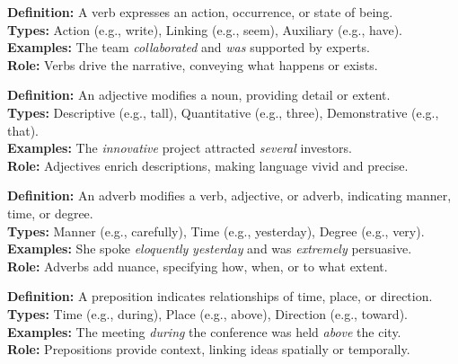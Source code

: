 \documentclass[a4paper,11pt]{article}
\begin{document}
\begin{tcolorbox}[colback=lightgray, colframe=navyblue, sharp corners, boxrule=0.5mm, title=\textbf{3. Verb: The Engine of Action}, boxsep=2pt, left=2pt, right=2pt, top=2pt, bottom=2pt]
    \footnotesize \textbf{Definition:} A verb expresses an action, occurrence, or state of being. \\
    \textbf{Types:} Action (e.g., write), Linking (e.g., seem), Auxiliary (e.g., have). \\
    \textbf{Examples:} The team \textit{collaborated} and \textit{was} supported by experts. \\
    \textbf{Role:} Verbs drive the narrative, conveying what happens or exists.
\end{tcolorbox}

\begin{tcolorbox}[colback=lightgray, colframe=navyblue, sharp corners, boxrule=0.5mm, title=\textbf{4. Adjective: The Descriptor}, boxsep=2pt, left=2pt, right=2pt, top=2pt, bottom=2pt]
    \footnotesize \textbf{Definition:} An adjective modifies a noun, providing detail or extent. \\
    \textbf{Types:} Descriptive (e.g., tall), Quantitative (e.g., three), Demonstrative (e.g., that). \\
    \textbf{Examples:} The \textit{innovative} project attracted \textit{several} investors. \\
    \textbf{Role:} Adjectives enrich descriptions, making language vivid and precise.
\end{tcolorbox}

\begin{tcolorbox}[colback=lightgray, colframe=navyblue, sharp corners, boxrule=0.5mm, title=\textbf{5. Adverb: The Modifier of Action}, boxsep=2pt, left=2pt, right=2pt, top=2pt, bottom=2pt]
    \footnotesize \textbf{Definition:} An adverb modifies a verb, adjective, or adverb, indicating manner, time, or degree. \\
    \textbf{Types:} Manner (e.g., carefully), Time (e.g., yesterday), Degree (e.g., very). \\
    \textbf{Examples:} She spoke \textit{eloquently} \textit{yesterday} and was \textit{extremely} persuasive. \\
    \textbf{Role:} Adverbs add nuance, specifying how, when, or to what extent.
\end{tcolorbox}

\begin{tcolorbox}[colback=lightgray, colframe=navyblue, sharp corners, boxrule=0.5mm, title=\textbf{6. Preposition: The Connector}, boxsep=2pt, left=2pt, right=2pt, top=2pt, bottom=2pt]
    \footnotesize \textbf{Definition:} A preposition indicates relationships of time, place, or direction. \\
    \textbf{Types:} Time (e.g., during), Place (e.g., above), Direction (e.g., toward). \\
    \textbf{Examples:} The meeting \textit{during} the conference was held \textit{above} the city. \\
    \textbf{Role:} Prepositions provide context, linking ideas spatially or temporally.
\end{tcolorbox}
\end{document}
